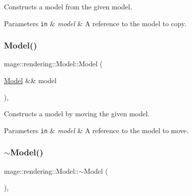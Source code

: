 Constructs a model from the given model.


\begin{DoxyParams}[1]{Parameters}
\mbox{\tt in}  & {\em model} & A reference to the model to copy. \\
\hline
\end{DoxyParams}
\mbox{\label{classmage_1_1rendering_1_1_model_a550ece2d159145d9e9549e48235d1ca1}} 
\subsubsection{\texorpdfstring{Model()}{Model()}\hspace{0.1cm}{\footnotesize\ttfamily [3/3]}}
{\footnotesize\ttfamily mage\+::rendering\+::\+Model\+::\+Model (\begin{DoxyParamCaption}\item[{\mbox{\hyperlink{classmage_1_1rendering_1_1_model}{Model}} \&\&}]{model }\end{DoxyParamCaption})\hspace{0.3cm}{\ttfamily [default]}, {\ttfamily [noexcept]}}

Constructs a model by moving the given model.


\begin{DoxyParams}[1]{Parameters}
\mbox{\tt in}  & {\em model} & A reference to the model to move. \\
\hline
\end{DoxyParams}
\mbox{\label{classmage_1_1rendering_1_1_model_a8fd12c516788a98ce5109aee41d834b8}} 
\subsubsection{\texorpdfstring{$\sim$\+Model()}{~Model()}}
{\footnotesize\ttfamily mage\+::rendering\+::\+Model\+::$\sim$\+Model (\begin{DoxyParamCaption}{ }\end{DoxyParamCaption})\hspace{0.3cm}{\ttfamily [virtual]}, {\ttfamily [default]}}

